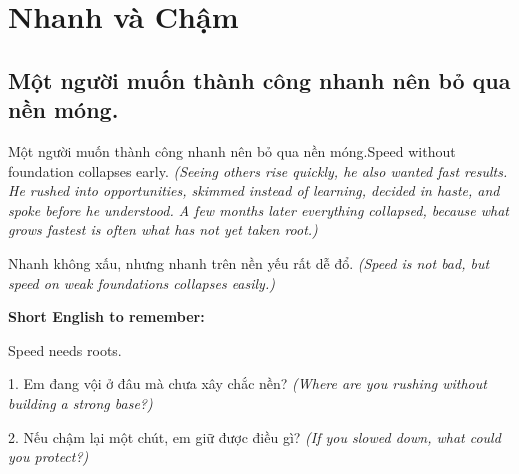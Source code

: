 \chapter{Nhanh và Chậm}

\section{Một người muốn thành công nhanh nên bỏ qua nền móng.}
\begin{truyen}{Một người muốn thành công nhanh nên bỏ qua nền móng.}{Speed without foundation collapses early.}
\textit{(Seeing others rise quickly, he also wanted fast results. He rushed into opportunities, skimmed instead of learning, decided in haste, and spoke before he understood. A few months later everything collapsed, because what grows fastest is often what has not yet taken root.)}
\end{truyen}
\begin{baihoc}
Nhanh không xấu, nhưng nhanh trên nền yếu rất dễ đổ.
\textit{(Speed is not bad, but speed on weak foundations collapses easily.)}
\end{baihoc}
\begin{ghinhoanh}
\textbf{Short English to remember:}

Speed needs roots.
\end{ghinhoanh}
\begin{tuhocnhanh}
1. Em đang vội ở đâu mà chưa xây chắc nền? \textit{(Where are you rushing without building a strong base?)}

2. Nếu chậm lại một chút, em giữ được điều gì? \textit{(If you slowed down, what could you protect?)}
\end{tuhocnhanh}
\ngancach

